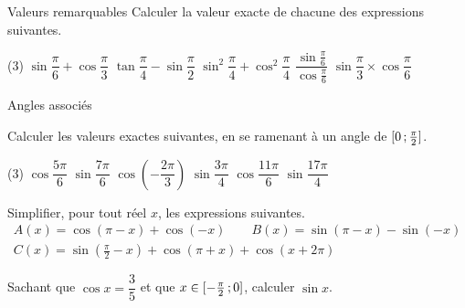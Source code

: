 \exercices
{}

\begin{exercice}[1]{Valeurs remarquables}
Calculer la valeur exacte de chacune des expressions suivantes.
\begin{tasks}(3)
  \task $\sin\dfrac{\pi}{6}+\cos\dfrac{\pi}{3}$
  \task $\tan\dfrac{\pi}{4}-\sin\dfrac{\pi}{2}$
  \task $\sin^{2}\dfrac{\pi}{4}+\cos^{2}\dfrac{\pi}{4}$
  \task $\dfrac{\sin\frac{\pi}{6}}{\cos\frac{\pi}{6}}$
  \task $\sin\dfrac{\pi}{3}\times\cos\dfrac{\pi}{6}$
\end{tasks}
\end{exercice}

\begin{exercice}[1]{Angles associés}
\begin{questions}
  \item Calculer les valeurs exactes suivantes, en se ramenant à un angle de $\mathopen{[}0\,{;}\,\frac{\pi}{2}\mathclose{]}$.
\begin{tasks}(3)
  \task $\cos\dfrac{5\pi}{6}$
  \task $\sin\dfrac{7\pi}{6}$
  \task $\cos\left(-\dfrac{2\pi}{3}\right)$
  \task $\sin\dfrac{3\pi}{4}$
  \task $\cos\dfrac{11\pi}{6}$
  \task $\sin\dfrac{17\pi}{4}$
\end{tasks}
  \item Simplifier, pour tout réel $x$, les expressions suivantes.
    \begin{gather*}
      A(x)=\cos(\pi-x)+\cos(-x) \qquad B(x)=\sin(\pi-x)-\sin(-x) \\
      C(x)=\sin\left(\tfrac{\pi}{2}-x\right)+\cos(\pi+x)+\cos(x+2\pi)
    \end{gather*}
  \item Sachant que $\cos x=\dfrac35$ et que $x\in\mathopen{[}-\frac{\pi}{2}\,{;}\,0\mathclose{]}$, calculer $\sin x$.
\end{questions}
\end{exercice}

